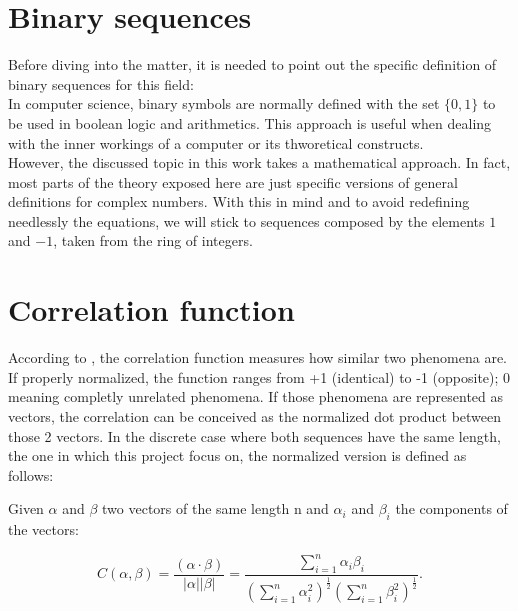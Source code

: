 \section{Binary sequences}

Before diving into the matter, it is needed to point out the specific definition
of binary sequences for this field:\\

In computer science, binary symbols are normally defined with the set $\{0, 1\}$ to
be used in boolean logic and arithmetics. This approach is useful when dealing
with the inner workings of a computer or its thworetical constructs.\\

However, the discussed topic in this work takes a mathematical approach. In fact,
most parts of the theory exposed here are just specific versions of general
definitions for complex numbers. With this in mind and to avoid redefining
needlessly the equations, we will stick to sequences composed by the elements
$1$ and $-1$, taken from the ring of integers.








\section{Correlation function}

According to \citet{golomb_ref}, the correlation function measures how similar
two phenomena are. If properly normalized, the function ranges from
+1 (identical) to -1 (opposite); 0 meaning completly unrelated phenomena.
If those phenomena are represented as vectors, the correlation can be conceived
as the normalized dot product between those 2 vectors.
In the discrete case where both sequences have the same length, the one in which
this project focus on, the normalized version is defined as follows:

\begin{definition}\label{def:1}

Given $\alpha$ and $\beta$ two vectors of the same length n and $\alpha_{i}$
and $\beta_{i}$ the components of the vectors:

\begin{equation}\label{eq:1}
C(\alpha , \beta)=\frac{(\alpha \cdot  \beta)}{|\alpha||\beta|}=\frac{\sum_{i=1}^{n} \alpha_{i}\beta_{i}}{(\sum_{i=1}^{n} \alpha_{i}^{2})^{\frac{1}{2}}(\sum_{i=1}^{n} \beta_{i}^{2})^\frac{1}{2}}.
\end{equation}
\end{definition}

